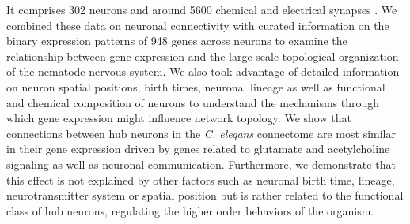 \documentclass[10pt,letterpaper]{article}
\begin{document}
It comprises 302 neurons and around 5600 chemical and electrical synapses \cite{White:1986tx}.
We combined these data on neuronal connectivity with curated information on the binary expression patterns of 948 genes across neurons to examine the relationship between gene expression and the large-scale topological organization of the nematode nervous system.
We also took advantage of detailed information on neuron spatial positions, birth times, neuronal lineage as well as functional and chemical composition of neurons to understand the mechanisms through which gene expression might influence network topology.
We show that connections between hub neurons in the \textit{C. elegans} connectome are most similar in their gene expression driven by genes related to glutamate and acetylcholine signaling as well as neuronal communication.
Furthermore, we demonstrate that this effect is not explained by other factors such as neuronal birth time, lineage, neurotransmitter system or spatial position but is rather related to the functional class of hub neurons, regulating the higher order behaviors of the organism.

\end{document}

